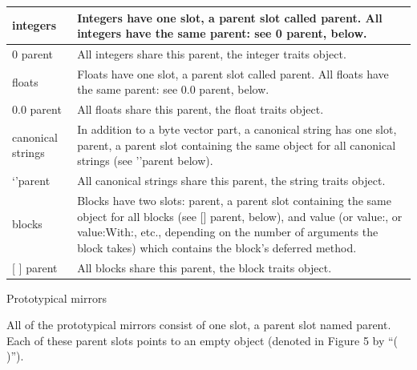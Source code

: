 \documentclass[letterpaper,10pt,english]{sphinxmanual}
\begin{document}
\begin{tabulary}{\linewidth}{p{5cm} p{10cm}}
\hline

integers
 & 
Integers have one slot, a parent slot called parent. All integers have the same parent: see 0 parent, below.
\\\hline

0 parent
 & 
All integers share this parent, the integer traits object.
\\\hline

floats
 & 
Floats have one slot, a parent slot called parent. All floats have the same parent: see 0.0 parent, below.
\\\hline

0.0 parent
 & 
All floats share this parent, the float traits object.
\\\hline

canonical strings
 & 
In addition to a byte vector part, a canonical string has one slot, parent, a parent slot containing the same object for all canonical strings (see ’’parent below).
\\\hline

`'parent
 & 
All canonical strings share this parent, the string traits object.
\\\hline

blocks
 & 
Blocks have two slots: parent, a parent slot containing the same object for all blocks (see {[}{]} parent, below), and value (or value:, or value:With:, etc., depending on the number of arguments the block takes) which contains the block’s deferred method.
\\\hline

{[} {]} parent
 & 
All blocks share this parent, the block traits object.
\\\hline
\end{tabulary}


Prototypical mirrors

All of the prototypical mirrors consist of one slot, a parent slot named parent. Each of
these parent slots points to an empty object (denoted in Figure 5 by “( )”).
\end{document}
